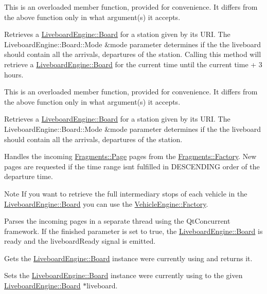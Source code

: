 This is an overloaded member function, provided for convenience. It differs from the above function only in what argument(s) it accepts.

Retrieves a \mbox{\hyperlink{classLiveboardEngine_1_1Board}{Liveboard\+Engine\+::\+Board}} for a station given by it\textquotesingle{}s U\+RI. The Liveboard\+Engine\+::\+Board\+::\+Mode \&mode parameter determines if the the liveboard should contain all the arrivals, departures of the station. Calling this method will retrieve a \mbox{\hyperlink{classLiveboardEngine_1_1Board}{Liveboard\+Engine\+::\+Board}} for the current time until the current time + 3 hours.

This is an overloaded member function, provided for convenience. It differs from the above function only in what argument(s) it accepts.

Retrieves a \mbox{\hyperlink{classLiveboardEngine_1_1Board}{Liveboard\+Engine\+::\+Board}} for a station given by it\textquotesingle{}s U\+RI. The Liveboard\+Engine\+::\+Board\+::\+Mode \&mode parameter determines if the the liveboard should contain all the arrivals, departures of the station.

Handles the incoming \mbox{\hyperlink{classFragments_1_1Page}{Fragments\+::\+Page}} pages from the \mbox{\hyperlink{classFragments_1_1Factory}{Fragments\+::\+Factory}}. New pages are requested if the time range isn\textquotesingle{}t fulfilled in D\+E\+S\+C\+E\+N\+D\+I\+NG order of the departure time.

\begin{DoxyNote}{Note}
If you want to retrieve the full intermediary stops of each vehicle in the \mbox{\hyperlink{classLiveboardEngine_1_1Board}{Liveboard\+Engine\+::\+Board}} you can use the \mbox{\hyperlink{classVehicleEngine_1_1Factory}{Vehicle\+Engine\+::\+Factory}}.
\end{DoxyNote}
Parses the incoming pages in a separate thread using the Qt\+Concurrent framework. If the finished parameter is set to true, the \mbox{\hyperlink{classLiveboardEngine_1_1Board}{Liveboard\+Engine\+::\+Board}} is ready and the liveboard\+Ready signal is emitted.

Gets the \mbox{\hyperlink{classLiveboardEngine_1_1Board}{Liveboard\+Engine\+::\+Board}} instance we\textquotesingle{}re currently using and returns it.

Sets the \mbox{\hyperlink{classLiveboardEngine_1_1Board}{Liveboard\+Engine\+::\+Board}} instance we\textquotesingle{}re currently using to the given \mbox{\hyperlink{classLiveboardEngine_1_1Board}{Liveboard\+Engine\+::\+Board}} $\ast$liveboard.


